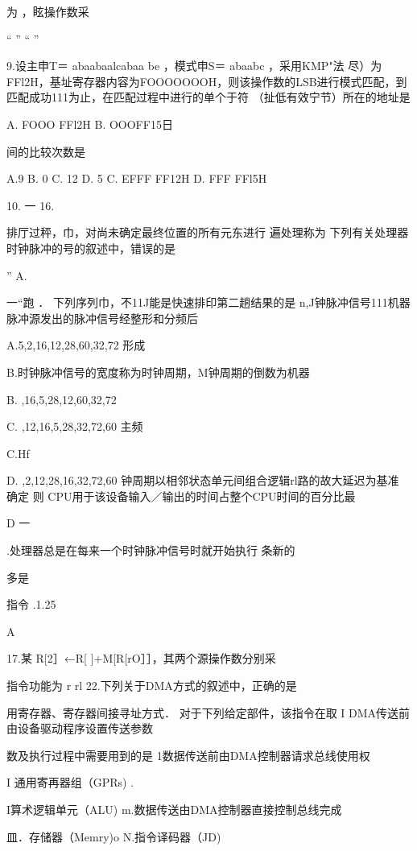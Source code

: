     为    ，眩操作数采

    “    ”    “    ”

9.设主申T＝ abaabaalcabaa be ，模式申S＝ abaabc ，采用KMP"法    尽）为FFl2H，基址寄存器内容为FOOOOOOOH，则该操作数的LSB进行模式匹配，到匹配成功111为止，在匹配过程中进行的单个于符    （扯低有效宁节）所在的地址是

    A. FOOO FFl2H     B. OOOFF15日

   间的比较次数是

   A.9    B. 0     C. 12    D. 5     C. EFFF FF12H     D. FFF FFl5H

10.    一    16.

    排厅过秤，巾，对尚未确定最终位置的所有元东进行  遍处理称为    下列有关处理器时钟脉冲的号的叙述中，错误的是

    ”    A.

    一“跑 ． 下列序列巾，不11J能是快速排印第二趟结果的是    n,J钟脉冲信号111机器脉冲源发出的脉冲信号经整形和分频后

    A.5,2,16,12,28,60,32,72    形成

    B.时钟脉冲信号的宽度称为时钟周期，M钟周期的倒数为机器

    B. ,16,5,28,12,60,32,72

    C. ,12,16,5,28,32,72,60    主频

    C.Hf

    D. ,2,12,28,16,32,72,60    钟周期以相邻状态单元间组合逻辑rl路的故大延迟为基准    确定    则 CPU用于该设备输入／输出的时间占整个CPU时间的百分比最

   D    一

    .处理器总是在每来一个时钟脉冲信号时就开始执行  条新的

    多是

    指令    .1.25%

    A

17.某    R[2］←R[ ]+M[R[rO］］，其两个源操作数分别采

    指令功能为   r    rl    22.下列关于DMA方式的叙述中，正确的是

   用寄存器、寄存器间接寻址方式． 对于下列给定部件，该指令在取    I DMA传送前由设备驱动程序设置传送参数

   数及执行过程中需要用到的是    1数据传送前由DMA控制器请求总线使用权

   I 通用寄再器组（GPRs)    .

    I算术逻辑单元（ALU)    m.数据传送由DMA控制器直接控制总线完成

   皿．存储器（Memry)o    N.指令译码器（JD)

